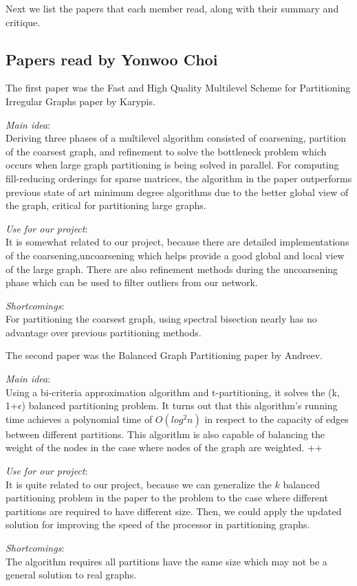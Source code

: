 Next we list the papers that each member read, along with their summary and critique.

\subsection{Papers read by Yonwoo Choi}
The first paper was the Fast and High Quality Multilevel Scheme for Partitioning Irregular Graphs paper by Karypis. 
\cite{Irregular_Graphs}
\begin{itemize*}
\item {\em Main idea}: \\
Deriving three phases of a multilevel algorithm consisted of coarsening, partition of the coarsest graph, and refinement to solve the bottleneck problem which occurs when large graph partitioning is being solved in parallel. For computing fill-reducing orderings for sparse matrices, the algorithm in the paper outperforms previous state of art minimum degree algorithms due to the better global view of the graph, critical for partitioning large graphs.    
\item {\em Use for our project}:\\
It is somewhat related to our project, because there are detailed implementations of the coarsening,uncoarsening which helps provide a good global and local view of the large graph. There are also refinement methods during the uncoarsening phase which can be used to filter outliers from our network. 
\item {\em Shortcomings}:\\
For partitioning the coarsest graph, using spectral bisection nearly has no advantage over previous partitioning methods.  
\end{itemize*}

The second paper was the Balanced Graph Partitioning paper by Andreev. 
\cite{BalancedGraphPartitioning}
\begin{itemize*}
\item {\em Main idea}: \\
Using a bi-criteria approximation algorithm and t-partitioning, it solves the (k, 1+$\epsilon$) balanced partitioning problem. It turns out that this algorithm's running time achieves a polynomial time of $O(log^{2}n)$ in respect to the capacity of edges between different partitions. This algorithm is also capable of balancing the weight of the nodes in the case where nodes of the graph are weighted.
++\item {\em Use for our project}: \\
It is quite related to our project, because we can generalize the $k$ balanced partitioning problem in the paper to the problem to the case where different partitions are required to have different size. Then, we could apply the updated solution for improving the speed of the processor in partitioning graphs.  
\item {\em Shortcomings}: \\
The algorithm requires all partitions have the same size which may not be a general solution to real graphs. 
\end{itemize*}

